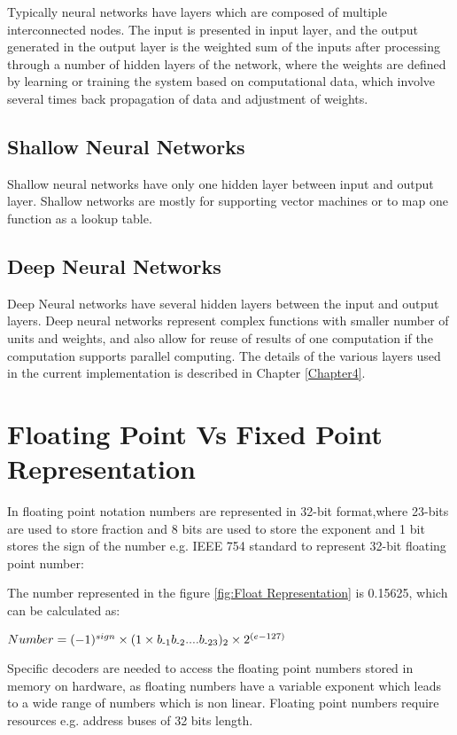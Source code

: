  \noindent Typically neural networks have layers which are composed of multiple interconnected nodes. The input is presented in input layer, and the output generated in the output layer is the weighted sum of the inputs after processing through a number of hidden layers of the network, where the weights are defined by learning or training the system based on computational data, which involve several times back propagation of data and adjustment of weights.
\subsection{Shallow Neural Networks} 
Shallow neural networks have only one hidden layer between input and output layer. Shallow networks are mostly for supporting vector machines or to map one function as a lookup table.
\subsection{Deep Neural Networks} Deep Neural networks have several hidden layers between the input and output layers. Deep neural networks represent complex functions with smaller number of units and weights, and also allow for reuse of results of one computation if the computation supports parallel computing. The details of the various layers used in the current implementation is described in Chapter \ref{Chapter4}.

\section{Floating Point Vs Fixed Point Representation}
 In floating point notation numbers are represented in 32-bit format,where 23-bits are used to store fraction and 8 bits are used to store the exponent and 1 bit stores the sign of the number e.g. IEEE 754 standard to represent 32-bit floating point number:

The number represented in the figure \ref{fig:Float Representation} is 0.15625, which can be calculated as:

\vspace{0.25cm}
\hspace{3cm}
$Number= (-1)^{sign}\times (1\times b\textsubscript{-1}b\textsubscript{-2}....b\textsubscript{-23})\textsubscript{2}\times 2^{(e-127)}$  

\vspace{0.25cm}
\noindent Specific decoders are needed to access the floating point numbers stored in memory on hardware, as floating numbers have a variable exponent which leads to a wide range of numbers which is non linear. Floating point numbers require resources e.g. address buses of 32 bits length.

